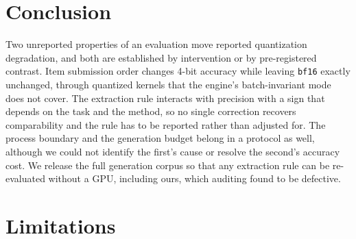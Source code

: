 \documentclass[11pt]{article}
\begin{document}
\section{Conclusion}
\label{sec:conclusion}

Two unreported properties of an evaluation move reported quantization degradation, and
both are established by intervention or by pre-registered contrast. Item submission order
changes 4-bit accuracy while leaving \texttt{bf16} exactly unchanged, through quantized
kernels that the engine's batch-invariant mode does not cover. The extraction rule
interacts with precision with a sign that depends on the task and the method, so no single
correction recovers comparability and the rule has to be reported rather than adjusted for.
The process boundary and the generation budget belong in a protocol as well, although we
could not identify the first's cause or resolve the second's accuracy cost. We release the
full generation corpus so that any extraction rule can be re-evaluated without a GPU,
including ours, which auditing found to be defective.

\label{end-of-body}

\section*{Limitations}
\label{sec:limitations}
\end{document}
